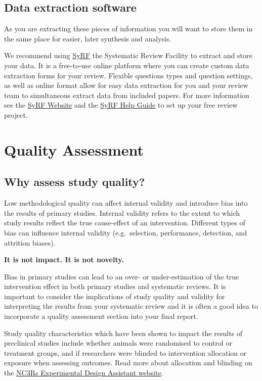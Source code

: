\documentclass[
]{book}
\begin{document}
\hypertarget{data-extraction-software}{%
\section{Data extraction software}\label{data-extraction-software}}

As you are extracting these pieces of information you will want to store them in the same place for easier, later synthesis and analysis.

We recommend using \href{https://syrf.org.uk/}{SyRF} the Systematic Review Facility to extract and store your data. It is a free-to-use online platform where you can create custom data extraction forms for your review. Flexible questions types and question settings, as well as online format allow for easy data extraction for you and your review team to simultaneous extract data from included papers. For more information see the \href{https://syrf.org.uk/}{SyRF Website} and the \href{https://help.syrf.org.uk/}{SyRF Help Guide} to set up your free review project.

\hypertarget{quality-assessment}{%
\chapter{Quality Assessment}\label{quality-assessment}}

\hypertarget{why-assess-study-quality}{%
\section{Why assess study quality?}\label{why-assess-study-quality}}

Low methodological quality can affect internal validity and introduce bias into the results of primary studies. Internal validity refers to the extent to which study results reflect the true cause-effect of an intervention. Different types of bias can influence internal validity (e.g.~selection, performance, detection, and attrition biases).

\textbf{It is not impact. It is not novelty.}

Bias in primary studies can lead to an over- or under-estimation of the true intervention effect in both primary studies and systematic reviews. It is important to consider the implications of study quality and validity for interpreting the results from your systematic review and it is often a good idea to incorporate a quality assessment section into your final report.

Study quality characteristics which have been shown to impact the results of preclinical studies include whether animals were randomised to control or treatment groups, and if researchers were blinded to intervention allocation or exposure when assessing outcomes.
Read more about allocation and blinding on the \href{https://eda.nc3rs.org.uk/experimental-design-allocation}{NC3Rs Experimental Design Assistant website}.
\end{document}

